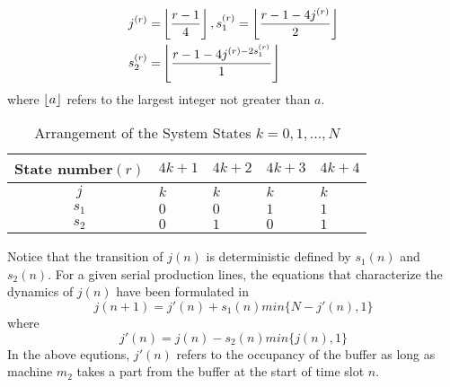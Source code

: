 \begin{equation}
	\begin{aligned}
		j^{(r)} =& \left\lfloor{\frac{r-1}{4}}\right\rfloor, s_1^{(r)} = \left\lfloor{\frac{r-1-4j^{(r)}}{2}}\right\rfloor \\
		s_2^{(r)} =& \left\lfloor{\frac{r-1-4j^{(r)-2s_1^{(r)}}}{1}}\right\rfloor
	\end{aligned}
\end{equation}
where $\left\lfloor{a}\right\rfloor$ refers to the largest integer not greater than $a$.
\begin{table}[H]
	\centering
	\caption{Arrangement of the System States $k = 0,1,...,N$}
	\begin{tabular}{c|llll}\hline
		State number$(r)$&$4k+1$ & $4k+2$  & $4k+3$ &  $4k+4$   \\\hline
		$j$   & $k$          & $k$      & $k$   &  $k$   \\
		$s_1$ & $0$          & $0$      & $1$   &  $1$ \\
		$s_2$ & $0$          & $1$      & $0$   &  $1$  \\ \hline
	\end{tabular}
	\label{two machine state}
\end{table}
Notice that the transition of $j(n)$ is deterministic defined by $s_1(n)$ and $s_2(n)$. For a given serial production lines, the equations that characterize the dynamics of $j(n)$ have been formulated in \cite{zhang2013transient}
\begin{equation}
	j(n+1)=j'(n) + s_1(n)min\{N-j'(n),1\}
	\label{number in buffer}
\end{equation}
where
\begin{equation}
	j'(n)=j(n)-s_2(n)min\{j(n),1\}
\label{occupation of buffer}
\end{equation}
In the above equtions, $j'(n)$ refers to the occupancy of the buffer as long as machine $m_2$ takes a part from the buffer at the start of time slot $n$.

